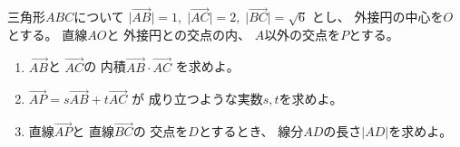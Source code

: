 \documentclass[12pt,b5paper]{ltjsarticle}
\begin{document}
\hrulefill

三角形$ABC$について
$\lvert \overrightarrow{AB} \rvert =1,\;
\lvert \overrightarrow{AC} \rvert =2,\;
\lvert \overrightarrow{BC} \rvert =\sqrt{6}$
とし、
外接円の中心を$O$とする。
直線$AO$と
外接円との交点の内、
$A$以外の交点を$P$とする。

\begin{enumerate}
 \item
      $\overrightarrow{AB}$と
      $\overrightarrow{AC}$の
      内積$\overrightarrow{AB}\cdot\overrightarrow{AC}$
      を求めよ。
 \item
      $\overrightarrow{AP} = s\overrightarrow{AB} +t\overrightarrow{AC}$
      が
      成り立つような実数$s,t$を求めよ。
 \item
      直線$\overrightarrow{AP}$と
      直線$\overrightarrow{BC}$の
      交点を$D$とするとき、
      線分$AD$の長さ$\lvert AD \rvert$を求めよ。
\end{enumerate}
\end{document}
